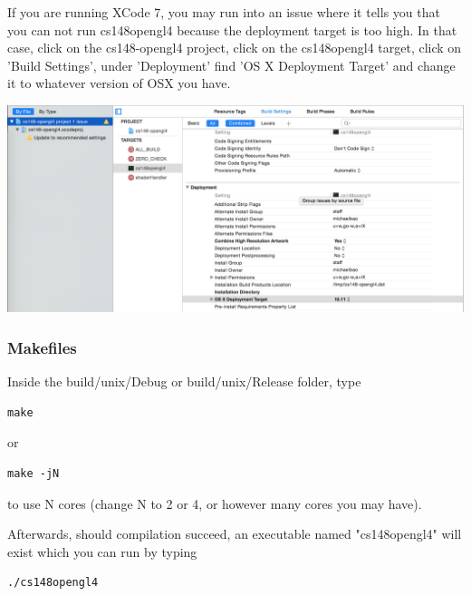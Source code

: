 \documentclass{article}
\begin{document}
If you are running XCode 7, you may run into an issue where it tells you that you can not run cs148opengl4 because the deployment target is too high. In that case, click on the cs148-opengl4 project, click on the cs148opengl4 target, click on 'Build Settings', under 'Deployment' find 'OS X Deployment Target' and change it to whatever version of OSX you have.

\includegraphics[width=\linewidth]{xcode3.png}

\subsubsection*{Makefiles}

Inside the build/unix/Debug or build/unix/Release folder, type

\begin{lstlisting}
make
\end{lstlisting}

or 

\begin{lstlisting}
make -jN
\end{lstlisting}

to use N cores (change N to 2 or 4, or however many cores you may have).

Afterwards, should compilation succeed, an executable named "cs148opengl4" will exist which you can run by typing 

\begin{lstlisting}
./cs148opengl4
\end{lstlisting}
\end{document}
